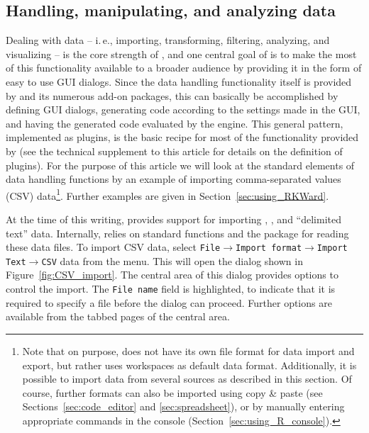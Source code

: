 \subsection{Handling, manipulating, and analyzing data}
\label{sec:analyzing_data}

Dealing with data -- i.\,e., importing, transforming, filtering, analyzing, and visualizing  --
is the core strength of , and one central goal of
 is to make the most of this functionality available to a broader
audience by providing it in the form of easy to use GUI dialogs. Since
the data handling functionality itself is provided by
 and its numerous add-on packages, this
can basically be accomplished by defining GUI dialogs, generating
 code according to the settings made in
the GUI, and having the generated code evaluated by the
 engine. 
This general pattern, implemented as plugins, is the
basic recipe for most of the functionality provided by 
(see the technical supplement to this article for details on the definition of plugins). For
the purpose of this article we will look at the standard
elements of data handling functions by an example of importing comma-separated values (CSV)
data\footnote {
  Note that on purpose,  does not have its
  own file format for data import and export, but rather uses
   workspaces as default data format. Additionally, it is possible
  to import data from several sources as described in this section. Of course, further formats can
  also be imported using copy \& paste (see Sections~\ref{sec:code_editor} and \ref{sec:spreadsheet}), or by
  manually entering appropriate  commands in
  the  console (Section~\ref{sec:using_R_console}).
}. Further examples are given in Section~\ref{sec:using_RKWard}.

At the time of this writing,  provides support for importing ,
, and ``delimited text'' data. Internally, 
relies on standard  functions and the package 
\citep{Murdoch2002} for reading these data files. To import CSV data,
select \texttt{File$\rightarrow$Import format$\rightarrow$Import Text$\rightarrow$CSV}
data from the menu. This will open the dialog shown in
Figure~\ref{fig:CSV_import}. The central area of this dialog provides 
options to control the import. The 
\texttt{File name} field is highlighted, to indicate that
it is required to specify a file before the dialog can proceed.
Further options are available from the tabbed pages of the central area.

